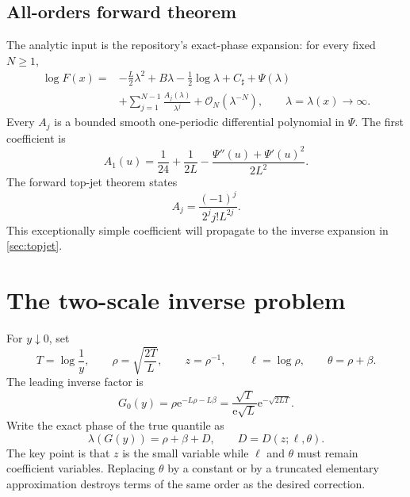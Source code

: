 \documentclass[11pt,oneside]{article}
\numberwithin{equation}{section}
\theoremstyle{definition}
\theoremstyle{remark}
\newcommand{\e}{\mathrm e}
\newcommand{\cO}{\mathcal O}
\newcommand{\Gzero}{G_0}
\newcommand{\Csharp}{C_{\sharp}}
\begin{document}
\subsection{All-orders forward theorem}
The analytic input is the repository's exact-phase expansion: for every fixed $N\ge1$,
\begin{equation}
\begin{split}
 \log F(x)={}&-\frac L2\lambda^2+B\lambda-\frac12\log\lambda
 +\Csharp+\Psi(\lambda)\\
 &+\sum_{j=1}^{N-1}\frac{A_j(\lambda)}{\lambda^j}
 +\cO_N(\lambda^{-N}),
 \qquad \lambda=\lambda(x)\to\infty.
\end{split}
\label{eq:forward-all-orders}
\end{equation}
Every $A_j$ is a bounded smooth one-periodic differential polynomial in $\Psi$.  The first coefficient is
\begin{equation}
 A_1(u)=\frac1{24}+\frac1{2L}
 -\frac{\Psi''(u)+\Psi'(u)^2}{2L^2}.
 \label{eq:A1}
\end{equation}
The forward top-jet theorem states
\begin{equation}
 [\Psi^{(2j)}]A_j
 =\frac{(-1)^j}{2^j j!L^{2j}}.
 \label{eq:forward-top-jet}
\end{equation}
This exceptionally simple coefficient will propagate to the inverse expansion in \cref{sec:topjet}.

\section{The two-scale inverse problem}
\label{sec:twoscale}

For $y\downarrow0$, set
\begin{equation}
 T=\log\frac1y,\qquad
 \rho=\sqrt{\frac{2T}{L}},\qquad
 z=\rho^{-1},\qquad
 \ell=\log\rho,\qquad
 \theta=\rho+\beta.
 \label{eq:inverse-variables}
\end{equation}
The leading inverse factor is
\begin{equation}
 \Gzero(y)=\rho\e^{-L\rho-L\beta}
 =\frac{\sqrt T}{\e\sqrt L}\e^{-\sqrt{2LT}}.
 \label{eq:G0}
\end{equation}
Write the exact phase of the true quantile as
\begin{equation}
 \lambda(G(y))=\rho+\beta+D,
 \qquad D=D(z;\ell,\theta).
 \label{eq:phase-D}
\end{equation}
The key point is that $z$ is the small variable while $\ell$ and $\theta$ must remain coefficient variables.  Replacing $\theta$ by a constant or by a truncated elementary approximation destroys terms of the same order as the desired correction.
\end{document}
